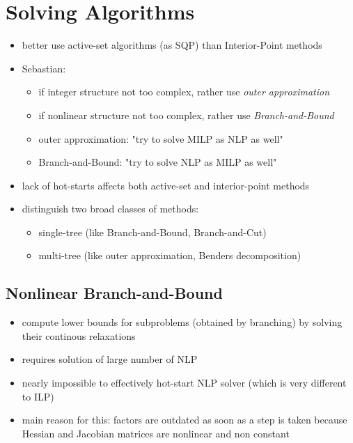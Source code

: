 \documentclass{article}
\begin{document}
\section{Solving Algorithms}
\begin{itemize}
\item better use active-set algorithms (as SQP) than Interior-Point methods
\item Sebastian: 
\begin{itemize}
\item if integer structure not too complex, rather use \textit{outer approximation}
\item if nonlinear structure not too complex, rather use \textit{Branch-and-Bound}
\item outer approximation: "try to solve MILP as NLP as well"
\item Branch-and-Bound: "try to solve NLP as MILP as well"
\end{itemize}
\item lack of hot-starts affects both active-set and interior-point methods
\item distinguish two broad classes of methods: 
\begin{itemize}
\item single-tree (like Branch-and-Bound, Branch-and-Cut) 
\item multi-tree (like outer approximation, Benders decomposition)
\end{itemize}

\end{itemize}


\subsection{Nonlinear Branch-and-Bound}
\begin{itemize}
\item compute lower bounds for subproblems (obtained by branching) by solving their continous relaxations
\item requires solution of large number of NLP
\item nearly impossible to effectively hot-start NLP solver (which is very different to ILP)
\item main reason for this: factors are outdated as soon as a step is taken because Hessian and Jacobian matrices are nonlinear and non constant
\end{itemize}
\end{document}
